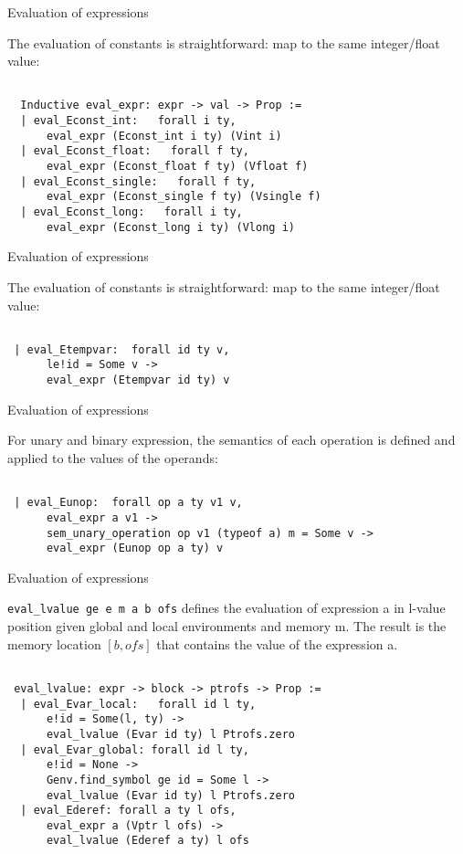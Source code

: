 \documentclass{beamer}
\begin{document}
\begin{frame}[fragile]{Evaluation of expressions}
 
The evaluation of constants is straightforward: map to the same integer/float value:
  
    \begin{lstlisting}[language=Coq]
   
  Inductive eval_expr: expr -> val -> Prop :=
  | eval_Econst_int:   forall i ty,
      eval_expr (Econst_int i ty) (Vint i)
  | eval_Econst_float:   forall f ty,
      eval_expr (Econst_float f ty) (Vfloat f)
  | eval_Econst_single:   forall f ty,
      eval_expr (Econst_single f ty) (Vsingle f)
  | eval_Econst_long:   forall i ty,
      eval_expr (Econst_long i ty) (Vlong i)
\end{lstlisting}
\end{frame}


\begin{frame}[fragile]{Evaluation of expressions}
 
The evaluation of constants is straightforward: map to the same integer/float value:
  
    \begin{lstlisting}[language=Coq]
   
 | eval_Etempvar:  forall id ty v,
      le!id = Some v ->
      eval_expr (Etempvar id ty) v
\end{lstlisting}
\end{frame}

 \begin{frame}[fragile]{Evaluation of expressions}

  For unary and binary expression, the semantics of each operation is defined and applied to the values of the operands:
  
    \begin{lstlisting}[language=Coq]
   
 | eval_Eunop:  forall op a ty v1 v,
      eval_expr a v1 ->
      sem_unary_operation op v1 (typeof a) m = Some v ->
      eval_expr (Eunop op a ty) v
\end{lstlisting}
\end{frame}


 \begin{frame}[fragile]{Evaluation of expressions}

\texttt{eval\_lvalue ge e m a b ofs} defines the evaluation of expression a
  in l-value position given global and local environments and memory m.  The result is the memory location $[b, ofs]$
  that contains the value of the expression a.
  
    \begin{lstlisting}[language=Coq]
   
 eval_lvalue: expr -> block -> ptrofs -> Prop :=
  | eval_Evar_local:   forall id l ty,
      e!id = Some(l, ty) ->
      eval_lvalue (Evar id ty) l Ptrofs.zero
  | eval_Evar_global: forall id l ty,
      e!id = None ->
      Genv.find_symbol ge id = Some l ->
      eval_lvalue (Evar id ty) l Ptrofs.zero
  | eval_Ederef: forall a ty l ofs,
      eval_expr a (Vptr l ofs) ->
      eval_lvalue (Ederef a ty) l ofs
\end{lstlisting}
\end{frame}
\end{document}
